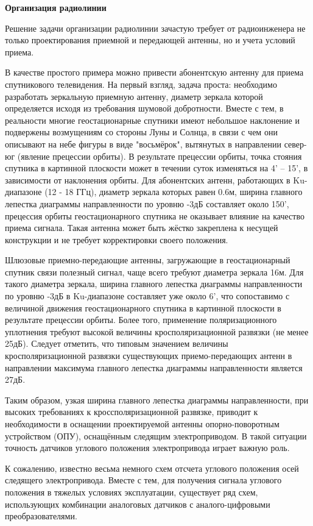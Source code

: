 \textbf{Организация радиолинии}

Решение задачи организации радиолинии зачастую требует от радиоинженера не только проектирования приемной и передающей антенны, но и учета условий приема. 

В качестве простого примера можно привести абонентскую антенну для приема спутникового телевидения. 
На первый взгляд, задача проста: необходимо разработать зеркальную приемную антенну, диаметр зеркала которой определяется исходя из требования шумовой добротности. 
Вместе с тем, в реальности многие геостационарные спутники имеют небольшое наклонение и подвержены возмущениям со стороны Луны и Солнца, в связи с чем они описывают на небе фигуры в виде "восьмёрок", 
вытянутых в направлении север-юг (явление прецессии орбиты). В результате прецессии орбиты, точка стояния спутника в картинной плоскости может в течении суток изменяться на 4' – 15', в зависимости от наклонения орбиты. 
Для абонентских антенн, работающих в Ku-диапазоне (12 - 18 ГГц), диаметр зеркала которых равен 0.6м, ширина главного лепестка диаграммы направленности по уровню -3дБ составляет около 150', 
прецессия орбиты геостационарного спутника не оказывает влияние на качество приема сигнала. Такая антенна может быть жёстко закреплена к несущей конструкции и не требует корректировки своего положения. 


Шлюзовые приемно-передающие антенны, загружающие в геостационарный спутник связи полезный сигнал, чаще всего требуют диаметра зеркала 16м. 
Для такого диаметра зеркала, ширина главного лепестка диаграммы направленности по уровню -3дБ в Ku-диапазоне составляет уже около 6', 
что сопоставимо с величиной движения геостационарного спутника в картинной плоскости в результате прецессии орбиты. 
Более того, применение поляризационного уплотнения требуют высокой величины кросполяризационной развязки (не менее 25дБ). 
Следует отметить, что типовым значением величины кросполяризационной развязки существующих приемо-передающих антенн в направлении максимума главного лепестка диаграммы направленности является 27дБ. 


Таким образом, узкая ширина главного лепестка диаграммы направленности, при высоких требованиях к кроссполяризационной развязке, 
приводит к необходимости в оснащении проектируемой антенны опорно-поворотным устройством (ОПУ), оснащённым следящим электроприводом.  
В такой ситуации точность датчиков углового положения электропривода играет важную роль.  

К сожалению, известно весьма немного схем отсчета углового положения осей следящего электропривода. Вместе с тем, для получения сигнала углового положения в тяжелых условиях эксплуатации, 
существует ряд схем, использующих комбинации аналоговых датчиков с аналого-цифровыми преобразователями.


